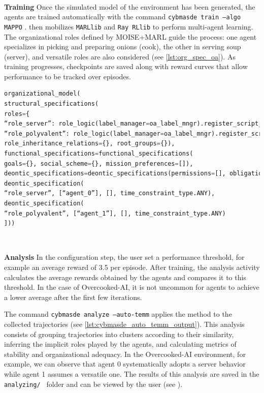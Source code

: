 \

\noindent
\textbf{Training} \quad
Once the simulated model of the environment has been generated, the agents are trained automatically with the command \texttt{cybmasde train --algo MAPPO} .  then mobilizes \texttt{MARLlib} and \texttt{Ray RLlib} to perform multi-agent learning. The organizational roles defined by MOISE+MARL guide the process: one agent specializes in picking and preparing onions (cook), the other in serving soup (server), and versatile roles are also considered (see \autoref{lst:org_spec_oa}). As training progresses, checkpoints are saved along with reward curves that allow performance to be tracked over episodes.

\begin{lstlisting}[language=Python,basicstyle=\scriptsize, label={lst:org_spec_oa}, caption={Excerpt from the organizational configuration file for Overcooked-AI}]
organizational_model(
structural_specifications(
roles={
“role_server”: role_logic(label_manager=oa_label_mngr).register_script_rule(primary_fun),
“role_polyvalent”: role_logic(label_manager=oa_label_mngr).register_script_rule(secondary_fun)},
role_inheritance_relations={}, root_groups={}),
functional_specifications=functional_specifications(
goals={}, social_scheme={}, mission_preferences=[]),
deontic_specifications=deontic_specifications(permissions=[], obligations=[
deontic_specification(
“role_server”, [“agent_0”], [], time_constraint_type.ANY),
deontic_specification(
“role_polyvalent”, [“agent_1”], [], time_constraint_type.ANY)
]))
\end{lstlisting}

\

\textbf{Analysis} \quad
In the configuration step, the user set a performance threshold, for example an average reward of 3.5 per episode. After training, the  analysis activity calculates the average rewards obtained by the agents and compares it to this threshold. In the case of Overcooked-AI, it is not uncommon for agents to achieve a lower average after the first few iterations.

The command \texttt{cybmasde analyze --auto-temm} applies the  method to the collected trajectories (see \autoref{lst:cybmasde_auto_temm_output}). This analysis consists of grouping trajectories into clusters according to their similarity, inferring the implicit roles played by the agents, and calculating metrics of stability and organizational adequacy. In the Overcooked-AI environment, for example, we can observe that agent 0 systematically adopts a server behavior while agent 1 assumes a versatile one. The results of this analysis are saved in the \texttt{analyzing/ } folder and can be viewed by the user (see \autocite{lst:cybmasde_auto_temm_spec_output}).


